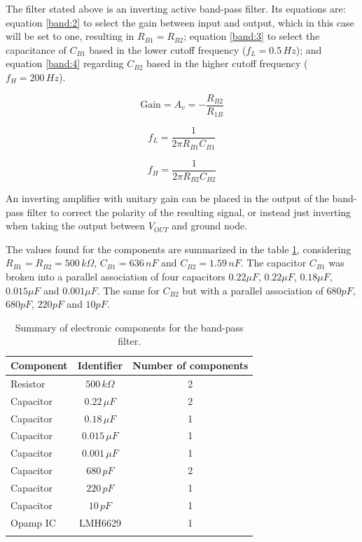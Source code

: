 

The filter stated above is an inverting active band-pass filter. Its equations are: equation \ref{band:2} to select the gain between input and output, which in this case will be set to one, resulting in $R_{B1} = R_{B2}$; equation \ref{band:3} to select the capacitance of $C_{B1}$ based in the lower cutoff frequency ($f_L = 0.5 \, Hz$); and equation \ref{band:4} regarding $C_{B2}$ based in the higher cutoff frequency ($f_H = 200 \, Hz$).

\begin{center}
\begin{equation} \label{band:2}
    \text{Gain} = A_v = - \frac{R_{B2}}{R_{1B}}
\end{equation}
\end{center}

\begin{center}
\begin{equation} \label{band:3}
    f_L = \frac{1}{2\pi R_{B1}C_{B1}}
\end{equation}
\end{center}

\begin{center}
\begin{equation} \label{band:4}
    f_H = \frac{1}{2\pi R_{B2}C_{B2}}
\end{equation}
\end{center}

An inverting amplifier with unitary gain can be placed in the output of the band-pass filter to correct the polarity of the resulting signal, or instead just inverting when taking the output between $V_{OUT}$ and ground node.

The values found for the components are summarized in the table \ref{tbl:4}, considering $R_{B1}=R_{B2}=500 \, k\Omega$, $C_{B1}=636 \, n F$ and $C_{B2} = 1.59 \, n F$. The capacitor $C_{B1}$ was broken into a parallel association of four capacitors $0.22 \mu F$, $0.22 \mu F$, $0.18 \mu F$, $0.015 \mu F$ and $0.001 \mu F$. The same for $C_{B2}$ but with a parallel association of $680 p F$, $680 p F$, $220 p F$ and $10 p F$.

\begin{longtable}[H]{lcc}

\toprule
Component & Identifier & Number of components \\
\midrule
\endhead
Resistor & $500 \, k\Omega$ & 2\\
Capacitor & $0.22 \, \mu F$ & 2 \\
Capacitor & $0.18 \, \mu F$ & 1 \\
Capacitor & $0.015 \, \mu F$ & 1 \\
Capacitor & $0.001 \, \mu F$ & 1 \\
Capacitor & $680 \, pF$ & 2\\
Capacitor & $220 \, pF$ & 1\\
Capacitor & $10 \, pF$ & 1\\
Opamp IC & LMH6629 & 1\\
\bottomrule
\caption{Summary of electronic components for the band-pass filter.}
\label{tbl:4}
\end{longtable}

